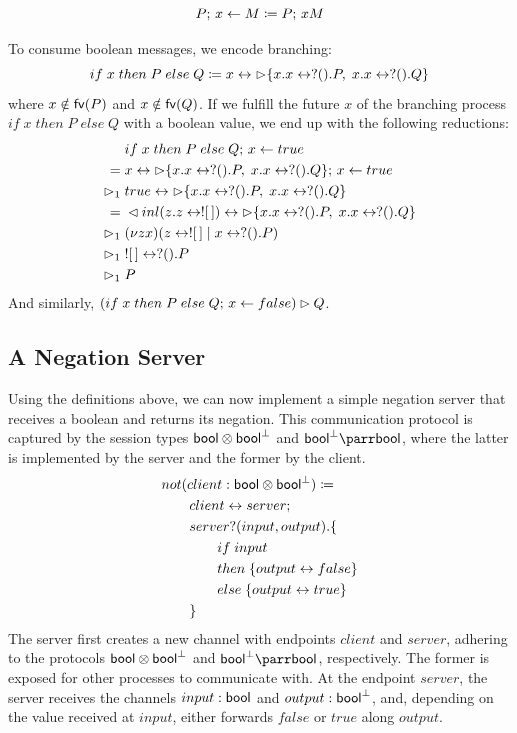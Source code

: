 \begin{definition}
  \[
    P ;\, x \leftarrow M \coloneq P ;\, xM
  \]
\end{definition}

To consume boolean messages, we encode branching:
\[
  if \; x \; then \; P \; else \; Q
  \coloneq x \leftrightarrow \rhd \{ x.x \leftrightarrow ? ().P,\; x.x \leftrightarrow ? ().Q \}
\]
where $x \notin \mathsf{fv}(P)$ and $x \notin \mathsf{fv}(Q)$. If we fulfill the future $x$
of the branching process $if \; x \; then \; P \; else \; Q$ with a boolean value,
we end up with the following reductions:
\begin{align*}
        &\; if \; x \; then \; P \; else \; Q ;\, x \leftarrow true \\
       =&\; x \leftrightarrow \rhd \{ x.x \leftrightarrow ? ().P,\; x.x \leftrightarrow ? ().Q \} ;\, x \leftarrow true \\
  \rhd_1&\; true \leftrightarrow \rhd \{ x.x \leftrightarrow ? ().P,\; x.x \leftrightarrow ? ().Q \} \\
       =&\; \lhd inl(z.z \leftrightarrow ! [\,]) \leftrightarrow \rhd \{ x.x \leftrightarrow ? ().P,\; x.x \leftrightarrow ? ().Q \} \\
  \rhd_1&\; (\nu z x)(z \leftrightarrow ! [\,] \mid x \leftrightarrow ? ().P) \\
  \rhd_1&\; ! [\,] \leftrightarrow ? ().P \\
  \rhd_1&\; P
\end{align*}
And similarly, $(if \; x \; then \; P \; else \; Q ;\, x \leftarrow false) \rhd Q$.

\subsection{A Negation Server}
Using the definitions above, we can now implement a simple negation server that
receives a boolean and returns its negation. This communication protocol
is captured by the session types $\textsf{bool} \otimes \textsf{bool}^\bot$ and $\cobool \parr \bool$,
where the latter is implemented by the server and the former by the client.
\begin{align*}
  &not(client : \textsf{bool} \otimes \textsf{bool}^\bot) \coloneq \\
  &\qquad client \leftrightarrow server ;\, \\
  &\qquad server ? (input, output).\{ \\
  &\qquad \qquad if \; input \; \\
  &\qquad \qquad then \; \{ output \leftrightarrow false \} \\
  &\qquad \qquad else \; \{ output \leftrightarrow true \} \\
  &\qquad \}
\end{align*}
The server first creates a new channel with endpoints $client$ and $server$,
adhering to the protocols $\textsf{bool} \otimes \textsf{bool}^\bot$ and $\cobool \parr \bool$,
respectively. The former is exposed for other processes to communicate with.
At the endpoint $server$, the server receives the channels $input : \textsf{bool}$
and $output : \textsf{bool}^\bot$, and, depending on the value received at $input$,
either forwards $false$ or $true$ along $output$.


